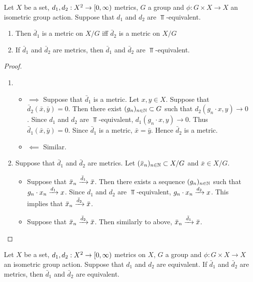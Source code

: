 \documentclass{book}
\begin{document}
	\begin{ex} \lex{}
	Let $X$ be a set, $d_1, d_2: X^2 \rightarrow [0,\infty)$ metrics, $G$ a group and $\phi: G \times X \rightarrow X$ an isometric group action. Suppose that $d_1$ and $d_2$ are $\Top$-equivalent. 
	\begin{enumerate}
	\item Then $\bar{d}_1$ is a metric on $X/G$ iff $\bar{d}_2$ is a metric on $X/G$
	\item If $\bar{d}_1$ and $\bar{d}_2$ are metrics, then $\bar{d}_1$ and $\bar{d}_2$ are $\Top$-equivalent. 
	\end{enumerate}
	\end{ex}
	
	\begin{proof}\
	\begin{enumerate}
	\item 
	\begin{itemize}
	\item $\implies$ Suppose that $\bar{d}_1$ is a metric. Let $x,y \in X$. Suppose that $\bar{d}_2(\bar{x}, \bar{y}) = 0$. Then there exist $(g_n)_{n \in \mathbb{N}} \subset G$ such that $d_2(g_n \cdot x, y) \rightarrow 0$. Since $d_1$ and $d_2$ are $\Top$-equivalent, $d_1(g_n \cdot x, y) \rightarrow 0$. Thus $\bar{d}_1(\bar{x}, \bar{y}) = 0$. Since $\bar{d}_1$ is a metric, $\bar{x} = \bar{y}$. Hence $\bar{d}_2$ is a metric. 
	\item $\impliedby$ Similar.
	\end{itemize}
	\item Suppose that $\bar{d}_1$ and $\bar{d}_2$ are metrics. Let $(\bar{x}_n)_{n \in \mathbb{N}} \subset X/G$ and $\bar{x} \in X/G$. 
	\begin{itemize}
	\item Suppose that $\bar{x}_n \xrightarrow{\bar{d}_1} \bar{x}$. Then there exists a sequence $(g_n)_{n \in \mathbb{N}}$ such that $g_n \cdot x_n \xrightarrow{d_1} x$. Since $d_1$ and $d_2$ are $\Top$-equivalent, $g_n \cdot x_n \xrightarrow{d_2} x$. This implies that $\bar{x}_n \xrightarrow{\bar{d}_2} \bar{x}$. 
	\item Suppose that $\bar{x}_n \xrightarrow{\bar{d}_2} \bar{x}$. Then similarly to above, $\bar{x}_n \xrightarrow{\bar{d}_1} \bar{x}$.
	\end{itemize}
	\end{enumerate}
	\end{proof}	
	
	\begin{ex} \lex{}
	Let $X$ be a set, $d_1, d_2: X^2 \rightarrow [0,\infty)$ metrics on $X$, $G$ a group and $\phi: G \times X \rightarrow X$ an isometric group action. Suppose that $d_1$ and $d_2$ are equivalent. If $\bar{d}_1$ and $\bar{d}_2$ are metrics, then $\bar{d}_1$ and $\bar{d}_2$ are equivalent.
	\end{ex}
	
\end{document}
